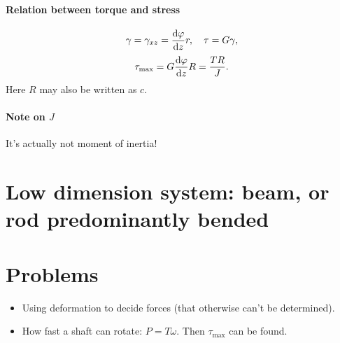 \documentclass[hyperref, a4paper]{article}
\begin{document}
\paragraph*{Relation between torque and stress}
\begin{equation}
    \gamma = \gamma_{xz} = \dv{\varphi}{z} r, \quad \tau = G \gamma, 
\end{equation}
\begin{equation}
    \tau_\text{max} = G \dv{\varphi}{z} R 
    = \frac{T R}{J} .
\end{equation}
Here $R$ may also be written as $c$.

\paragraph*{Note on $J$} It's actually not moment of inertia! 

\section{Low dimension system: beam, or rod predominantly bended}



\section{Problems}

\begin{itemize}
    \item Using deformation to decide forces (that otherwise can't be determined).
    \item How fast a shaft can rotate: $P = T \omega$. Then $\tau_{\text{max}}$ can be found.
\end{itemize}
\end{document}
